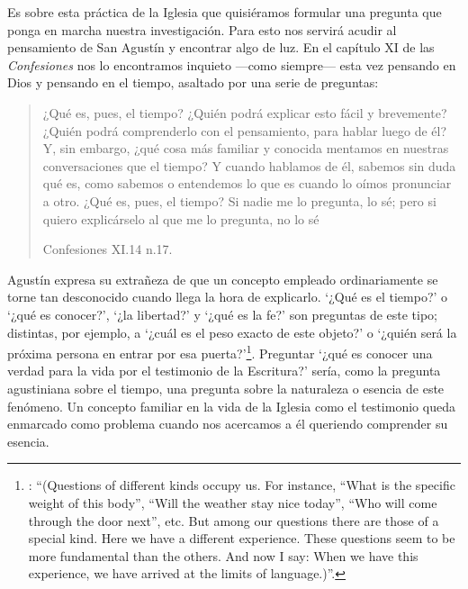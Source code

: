 Es sobre esta práctica de la Iglesia que quisiéramos formular una pregunta que ponga en marcha nuestra investigación. Para esto nos servirá acudir al pensamiento de San Agustín y encontrar algo de luz. En el capítulo XI de las \emph{Confesiones} nos lo encontramos inquieto ---como siempre--- esta vez pensando en Dios y pensando en el tiempo, asaltado por una serie de preguntas:

\blockquote[Confesiones XI.14 n.17.]{¿Qué es, pues, el tiempo? ¿Quién podrá explicar esto fácil y brevemente? ¿Quién podrá comprenderlo con el pensamiento, para hablar luego de él? Y, sin embargo, ¿qué cosa más familiar y conocida mentamos en nuestras conversaciones que el tiempo? Y cuando hablamos de él, sabemos sin duda qué es, como sabemos o entendemos lo que es cuando lo oímos pronunciar a otro. ¿Qué es, pues, el tiempo? Si nadie me lo pregunta, lo sé; pero si quiero explicárselo al que me lo pregunta, no lo sé}.

Agustín expresa su extrañeza de que un concepto empleado ordinariamente se torne tan desconocido cuando llega la hora de explicarlo. \enquote*{¿Qué es el tiempo?} o \enquote*{¿qué es conocer?}, \enquote*{¿la libertad?} y \enquote*{¿qué es la fe?} son preguntas de este tipo; distintas, por ejemplo, a \enquote*{¿cuál es el peso exacto de este objeto?} o \enquote*{¿quién será la próxima persona en entrar por esa puerta?}\footnote{\Cite[Cf.][304]{wittgenstein2005bt}: \enquote{(Questions of different kinds occupy us. For instance, ``What is the specific weight of this body'', ``Will the weather stay nice today'', ``Who will come through the door next'', etc. But among our questions there are those of a special kind. Here we have a different experience. These questions seem to be more fundamental than the others. And now I say: When we have this experience, we have arrived at the limits of language.)}.}. Preguntar \enquote*{¿qué es conocer una verdad para la vida por el testimonio de la Escritura?} sería, como la pregunta agustiniana sobre el tiempo, una pregunta sobre la naturaleza o esencia de este fenómeno. Un concepto familiar en la vida de la Iglesia como el testimonio queda enmarcado como problema cuando nos acercamos a él queriendo comprender su esencia.


